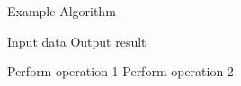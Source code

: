 \documentclass{article}
\begin{document}
\begin{algorithm}
    \caption{Example Algorithm}
    \begin{algorithmic}[1] %
        \Require Input data
        \Ensure Output result
        
            \State Perform operation 1
            \State Perform operation 2
        \EndWhile
    \end{algorithmic}
\end{algorithm}
\end{document}
